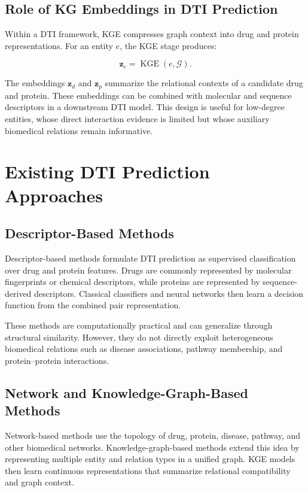 \subsection{Role of KG Embeddings in DTI Prediction}

Within a DTI framework, KGE compresses graph context into drug and protein
representations. For an entity $e$, the KGE stage produces:

\begin{equation}
    \mathbf{z}_{e}
    =
    \operatorname{KGE}(e,\mathcal{G}).
\end{equation}

The embeddings $\mathbf{z}_{d}$ and $\mathbf{z}_{p}$ summarize the relational
contexts of a candidate drug and protein. These embeddings can be combined
with molecular and sequence descriptors in a downstream DTI model. This design
is useful for low-degree entities, whose direct interaction evidence is
limited but whose auxiliary biomedical relations remain informative.

\section{Existing DTI Prediction Approaches}

\subsection{Descriptor-Based Methods}

Descriptor-based methods formulate DTI prediction as supervised classification
over drug and protein features. Drugs are commonly represented by molecular
fingerprints or chemical descriptors, while proteins are represented by
sequence-derived descriptors. Classical classifiers and neural networks then
learn a decision function from the combined pair representation.

These methods are computationally practical and can generalize through
structural similarity. However, they do not directly exploit heterogeneous
biomedical relations such as disease associations, pathway membership, and
protein--protein interactions.

\subsection{Network and Knowledge-Graph-Based Methods}

Network-based methods use the topology of drug, protein, disease, pathway, and
other biomedical networks. Knowledge-graph-based methods extend this idea by
representing multiple entity and relation types in a unified graph. KGE models
then learn continuous representations that summarize relational compatibility
and graph context.

